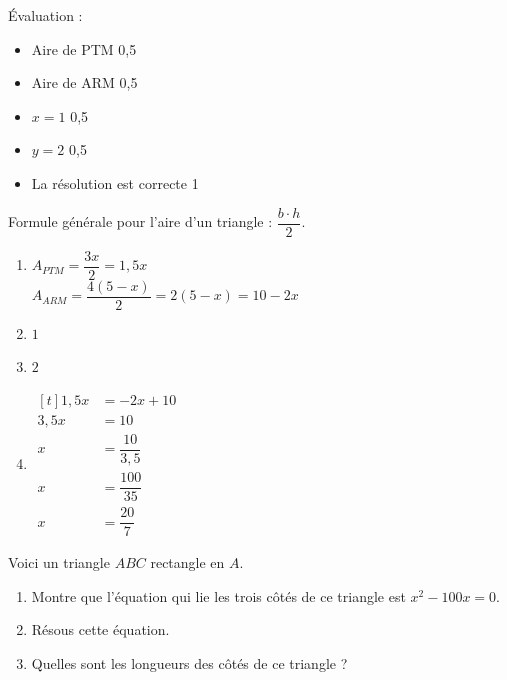 \documentclass[../partie1.tex]{subfiles}
\begin{document}
\begin{solution}
    Évaluation :
    \begin{itemize}
        \item Aire de PTM \hfill 0,5
        \item Aire de ARM \hfill 0,5
        \item $x=1$ \hfill 0,5
        \item $y=2$ \hfill 0,5
        \item La résolution est correcte \hfill 1
    \end{itemize}
    Formule générale pour l'aire d'un triangle : $\dfrac{b \cdot h}{2}$.
    \begin{enumerate}[cols=2]
        \item 
        $A_{PTM} = \dfrac{3x}{2} = 1,5x$\\
        $A_{ARM} = \dfrac{4(5-x)}{2} = 2(5-x) = 10-2x$
        \item $1$
        \item $2$
        \item 
        $\begin{aligned}[t]
            1,5 x &= -2x + 10\\
            3,5x &= 10\\
            x &= \dfrac{10}{3,5}\\
            x &= \dfrac{100}{35}\\
            x &= \dfrac{20}{7}    
        \end{aligned}$
    \end{enumerate}
\end{solution}
\begin{exercise}[points=4]
    Voici un triangle $ABC$ rectangle en $A$.
    \begin{center}
        
    \end{center}
    \begin{enumerate}
        \item %
         Montre que l'équation qui lie les trois côtés de ce triangle est $x^2-100x = 0$.
        \item %
        Résous cette équation.
        \item %
        Quelles sont les longueurs des côtés de ce triangle ?
    \end{enumerate}
\end{exercise}
\end{document}
